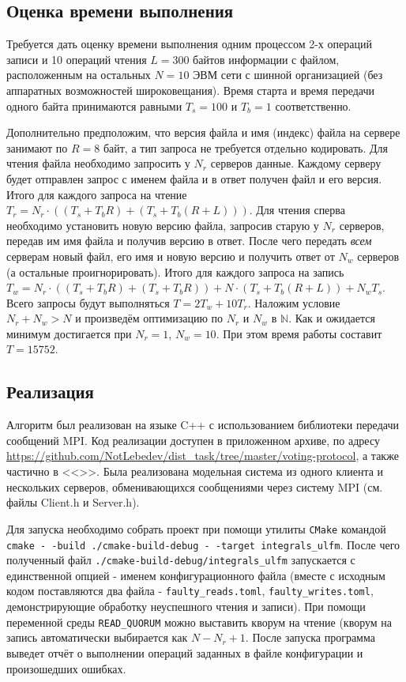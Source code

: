 \documentclass[a4paper,12pt,titlepage,finall]{article}
\begin{document}
\subsection{Оценка времени выполнения}
Требуется дать оценку времени выполнения одним процессом 2-х операций записи и 10 операций чтения $L=300$ байтов информации с файлом, расположенным на остальных $N=10$ ЭВМ сети с шинной организацией (без аппаратных возможностей широковещания). Время старта и время передачи одного байта принимаются равными $T_s=100$ и $T_b=1$ соответственно. \par
Дополнительно предположим, что версия файла и имя (индекс) файла на сервере занимают по $R=8$ байт, а тип запроса не требуется отдельно кодировать. Для чтения файла необходимо запросить у $N_r$ серверов данные. Каждому серверу будет отправлен запрос с именем файла и в ответ получен файл и его версия. Итого для каждого запроса на чтение $T_r = N_r \cdot ((T_s + T_b R) + (T_s + T_b (R + L)))$. Для чтения сперва необходимо установить новую версию файла, запросив старую у $N_r$ серверов, передав им имя файла и получив версию в ответ. После чего передать \emph{всем} серверам новый файл, его имя и новую версию и получить ответ от $N_w$ серверов (а остальные проигнорировать). Итого для каждого запроса на запись $T_w = N_r \cdot ((T_s + T_b R) + (T_s + T_b R)) + N \cdot (T_s + T_b(R + L)) + N_w T_s$. Всего запросы будут выполняться $T = 2T_w + 10T_r$. Наложим условие $N_r + N_w > N$ и произведём оптимизацию по $N_r$ и $N_w$ в $\mathbb{N}$. Как и ожидается минимум достигается при $N_r = 1$, $N_w = 10$. При этом время работы составит $T=15752$.
\subsection{Реализация}
Алгоритм был реализован на языке C++ с использованием библиотеки передачи сообщений MPI. Код реализации доступен в приложенном архиве, по адресу \url{https://github.com/NotLebedev/dist_task/tree/master/voting-protocol}, а также частично в <<>>. Была реализована модельная система из одного клиента и нескольких серверов, обменивающихся сообщениями через систему MPI (см. файлы Client.h и Server.h).\par
Для запуска необходимо собрать проект при помощи утилиты  \texttt{CMake} командой  \texttt{cmake - -build ./cmake-build-debug - -target integrals\_ulfm}. После чего полученный файл \texttt{./cmake-build-debug/integrals\_ulfm} запускается с единственной опцией - именем конфигурационного файла (вместе с исходным кодом поставляются два файла - \texttt{faulty\_reads.toml}, \texttt{faulty\_writes.toml}, демонстрирующие обработку неуспешного чтения и записи). При помощи переменной среды \texttt{READ\_QUORUM} можно  выставить кворум на чтение (кворум на запись автоматически выбирается как $N - N_r + 1$. После запуска программа выведет отчёт о выполнении операций заданных в файле конфигурации и произошедших ошибках.
\end{document}
